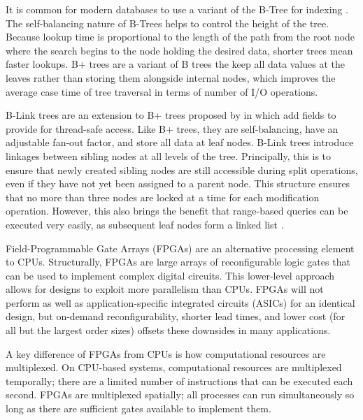 
\label{sec:indexing}

It is common for modern databases to use a variant of the B-Tree for indexing
\autocite{ma-tpds-2022}. The self-balancing nature of B-Trees helps to control
the height of the tree. Because lookup time is proportional to the length of the
path from the root node where the search begins to the node holding the desired
data, shorter trees mean faster lookups. B+ trees are a variant of B trees the
keep all data values at the leaves rather than storing them alongside internal
nodes, which improves the average case time of tree traversal in terms of number
of I/O operations.

B-Link trees are an extension to B+ trees proposed by \citeauthor{b-link} in
\citeyear{b-link} which add fields to provide for thread-safe access. Like B+
trees, they are self-balancing, have an adjustable fan-out factor, and store all
data at leaf nodes. B-Link trees introduce linkages between sibling nodes at all
levels of the tree. Principally, this is to ensure that newly created sibling
nodes are still accessible during split operations, even if they have not yet
been assigned to a parent node. This structure ensures that no more than three
nodes are locked at a time for each modification operation. However, this also
brings the benefit that range-based queries can be executed very easily, as
subsequent leaf nodes form a linked list \autocite{b-link}.


\label{sec:fpga}

Field-Programmable Gate Arrays (FPGAs) are an alternative processing element to
CPUs. Structurally, FPGAs are large arrays of reconfigurable logic gates that
can be used to implement complex digital circuits. This lower-level approach
allows for designs to exploit more parallelism than CPUs. FPGAs will not perform
as well as application-specific integrated circuits (ASICs) for an identical
design, but on-demand reconfigurability, shorter lead times, and lower cost (for
all but the largest order sizes) offsets these downsides in many applications.

A key difference of FPGAs from CPUs is how computational resources are
multiplexed. On CPU-based systems, computational resources are multiplexed
temporally; there are a limited number of instructions that can be executed each
second. FPGAs are multiplexed spatially; all processes can run simultaneously so
long as there are sufficient gates available to implement them.

